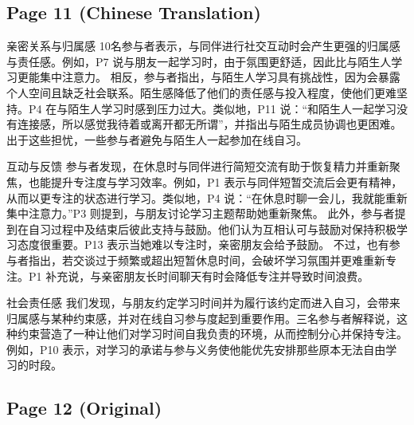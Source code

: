 \documentclass[12pt]{ctexart}
\begin{document}
\subsection*{Page 11 (Chinese Translation)}

亲密关系与归属感
10名参与者表示，与同伴进行社交互动时会产生更强的归属感与责任感。例如，P7 说与朋友一起学习时，由于氛围更舒适，因此比与陌生人学习更能集中注意力。
相反，参与者指出，与陌生人学习具有挑战性，因为会暴露个人空间且缺乏社会联系。陌生感降低了他们的责任感与投入程度，使他们更难坚持。P4 在与陌生人学习时感到压力过大。类似地，P11 说：“和陌生人一起学习没有连接感，所以感觉我待着或离开都无所谓”，并指出与陌生成员协调也更困难。出于这些担忧，一些参与者避免与陌生人一起参加在线自习。

互动与反馈
参与者发现，在休息时与同伴进行简短交流有助于恢复精力并重新聚焦，也能提升专注度与学习效率。例如，P1 表示与同伴短暂交流后会更有精神，从而以更专注的状态进行学习。类似地，P4 说：“在休息时聊一会儿，我就能重新集中注意力。”P3 则提到，与朋友讨论学习主题帮助她重新聚焦。
此外，参与者提到在自习过程中及结束后彼此支持与鼓励。他们认为互相认可与鼓励对保持积极学习态度很重要。P13 表示当她难以专注时，亲密朋友会给予鼓励。
不过，也有参与者指出，若交谈过于频繁或超出短暂休息时间，会破坏学习氛围并更难重新专注。P1 补充说，与亲密朋友长时间聊天有时会降低专注并导致时间浪费。

社会责任感
我们发现，与朋友约定学习时间并为履行该约定而进入自习，会带来归属感与某种约束感，并对在线自习参与度起到重要作用。三名参与者解释说，这种约束营造了一种让他们对学习时间自我负责的环境，从而控制分心并保持专注。例如，P10 表示，对学习的承诺与参与义务使他能优先安排那些原本无法自由学习的时段。

\subsection*{Page 12 (Original)}
\end{document}
